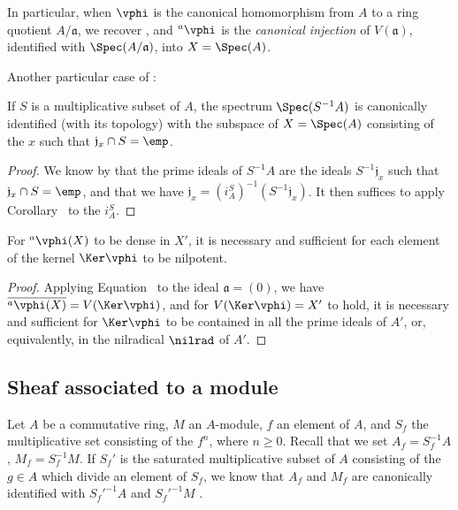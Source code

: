 \begin{env}[1.2.5]
\label{I.1.2.5}
In particular, when $\vphi$ is the canonical homomorphism from $A$ to a ring quotient $A/\mathfrak{a}$, we recover , and ${}^a\vphi$ is the \emph{canonical injection} of $V(\mathfrak{a})$, identified with $\Spec(A/\mathfrak{a})$, into $X=\Spec(A)$.
\end{env}

Another particular case of :
\begin{corollary}[1.2.6]
\label{I.1.2.6}
If $S$ is a multiplicative subset of $A$, the spectrum $\Spec(S^{-1}A)$ is canonically identified (with its topology) with the subspace of $X=\Spec(A)$ consisting of the $x$ such that $\mathfrak{j}_x\cap S=\emp$.
\end{corollary}

\begin{proof}
We know by  that the prime ideals of $S^{-1}A$ are the ideals $S^{-1}\mathfrak{j}_x$ such that $\mathfrak{j}_x\cap S=\emp$, and that we have $\mathfrak{j}_x=(i_A^S)^{-1}(S^{-1}\mathfrak{j}_x)$.
It then suffices to apply Corollary~ to the $i_A^S$.
\end{proof}

\begin{corollary}[1.2.7]
\label{I.1.2.7}
For ${}^a\vphi(X)$ to be dense in $X'$, it is necessary and sufficient for each element of the kernel $\Ker\vphi$ to be nilpotent.
\end{corollary}

\begin{proof}
Applying Equation~ to the ideal $\mathfrak{a}=(0)$, we have $\overline{{}^a\vphi(X)}=V(\Ker\vphi)$, and for $V(\Ker\vphi)=X'$ to hold, it is necessary and sufficient for $\Ker\vphi$ to be contained in all the prime ideals of $A'$, or, equivalently, in the nilradical $\nilrad$ of $A'$.
\end{proof}

\subsection{Sheaf associated to a module}
\label{subsection:I.1.3}
\label{I.1.3}

\begin{env}[1.3.1]
\label{I.1.3.1}
Let $A$ be a commutative ring, $M$ an $A$-module, $f$ an element of $A$, and $S_f$ the multiplicative set consisting of the $f^n$, where $n\geq 0$.
Recall that we set $A_f=S_f^{-1}A$, $M_f=S_f^{-1}M$.
If $S_f'$ is the saturated multiplicative subset of $A$ consisting of the $g\in A$ which divide an element of $S_f$, we know that $A_f$ and $M_f$ are canonically identified with ${S_f'}^{-1}A$ and ${S_f'}^{-1}M$ .
\end{env}

